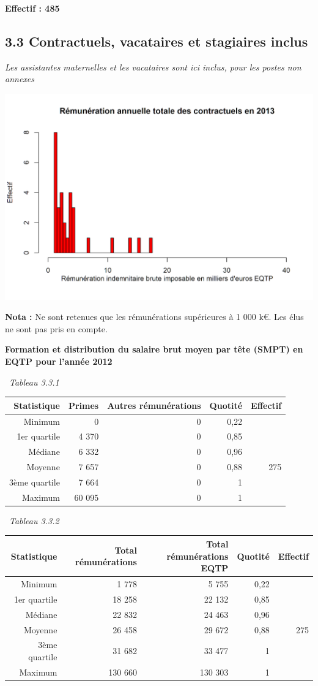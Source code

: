 \textbf{Effectif : 485 }

\hypertarget{contractuels-vacataires-et-stagiaires-inclus-1}{%
\subsection{3.3 Contractuels, vacataires et stagiaires
inclus}\label{contractuels-vacataires-et-stagiaires-inclus-1}}

\emph{Les assistantes maternelles et les vacataires sont ici inclus,
pour les postes non annexes}

\includegraphics{altair_files/figure-latex/unnamed-chunk-94-1.png}

\textbf{Nota :} Ne sont retenues que les rémunérations supérieures à 1
000 k€. Les élus ne sont pas pris en compte.

\textbf{Formation et distribution du salaire brut moyen par tête (SMPT)
en EQTP pour l'année 2012 }

~\emph{Tableau 3.3.1}

\begin{longtable}[]{@{}rrrrr@{}}
\toprule
Statistique & Primes & Autres rémunérations & Quotité &
Effectif\tabularnewline
\midrule
\endhead
Minimum & 0 & 0 & 0,22 &\tabularnewline
1er quartile & 4 370 & 0 & 0,85 &\tabularnewline
Médiane & 6 332 & 0 & 0,96 &\tabularnewline
Moyenne & 7 657 & 0 & 0,88 & 275\tabularnewline
3ème quartile & 7 664 & 0 & 1 &\tabularnewline
Maximum & 60 095 & 0 & 1 &\tabularnewline
\bottomrule
\end{longtable}

~\emph{Tableau 3.3.2}

\begin{longtable}[]{@{}rrrrr@{}}
\toprule
Statistique & Total rémunérations & Total rémunérations EQTP & Quotité &
Effectif\tabularnewline
\midrule
\endhead
Minimum & 1 778 & 5 755 & 0,22 &\tabularnewline
1er quartile & 18 258 & 22 132 & 0,85 &\tabularnewline
Médiane & 22 832 & 24 463 & 0,96 &\tabularnewline
Moyenne & 26 458 & 29 672 & 0,88 & 275\tabularnewline
3ème quartile & 31 682 & 33 477 & 1 &\tabularnewline
Maximum & 130 660 & 130 303 & 1 &\tabularnewline
\bottomrule
\end{longtable}

